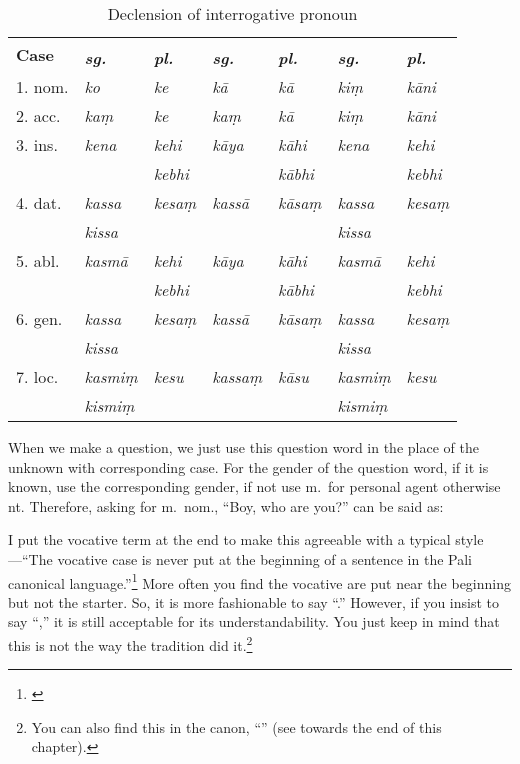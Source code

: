 \begin{table}[!hbt]
\centering\small
\caption{Declension of interrogative pronoun}
\label{tab:kim}
\bigskip
\begin{tabular}{@{}l*{6}{>{\itshape}l}@{}} \toprule
\multirow{2}{*}{\bfseries\upshape Case} & \multicolumn{2}{c}{\bfseries\upshape m.} & \multicolumn{2}{c}{\bfseries\upshape f.} & \multicolumn{2}{c}{\bfseries\upshape nt.} \\
\cmidrule(lr){2-3} \cmidrule(lr){4-5} \cmidrule(lr){6-7} 
& \bfseries\upshape sg. & \bfseries\upshape pl. & \bfseries\upshape sg. & \bfseries\upshape pl. & \bfseries\upshape sg. & \bfseries\upshape pl. \\
\midrule
1. nom. & ko & ke & k\=a & k\=a & ki\d m & k\=ani \\
2. acc. & ka\d m & ke & ka\d m & k\=a & ki\d m & k\=ani \\
3. ins. & kena & kehi & k\=aya & k\=ahi & kena & kehi \\
& & kebhi & & k\=abhi & & kebhi \\
4. dat. & kassa & kesa\d m & kass\=a & k\=asa\d m & kassa & kesa\d m \\
& kissa & & & & kissa & \\
5. abl. & kasm\=a & kehi & k\=aya & k\=ahi & kasm\=a & kehi \\
& & kebhi & & k\=abhi & & kebhi \\
6. gen. & kassa & kesa\d m & kass\=a & k\=asa\d m & kassa & kesa\d m \\
& kissa & & & & kissa & \\
7. loc. & kasmi\d m & kesu & kassa\d m & k\=asu & kasmi\d m & kesu \\
& kismi\d m & & & & kismi\d m & \\
\bottomrule
\end{tabular}
\end{table}

When we make a question, we just use this question word in the place of the unknown with corresponding case. For the gender of the question word, if it is known, use the corresponding gender, if not use m.\ for personal agent otherwise nt. Therefore, asking for m.\ nom., ``Boy, who are you?'' can be said as:


I put the vocative term at the end to make this agreeable with a typical style---``The vocative case is never put at the beginning of a sentence in the Pali canonical language.''\footnote{\citealp[p.~304]{perniola:grammar}} More often you find the vocative are put near the beginning but not the starter. So, it is more fashionable to say ``.'' However, if you insist to say ``,'' it is still acceptable for its understandability. You just keep in mind that this is not the way the tradition did it.\footnote{You can also find this in the canon, ``'' (see towards the end of this chapter).}

